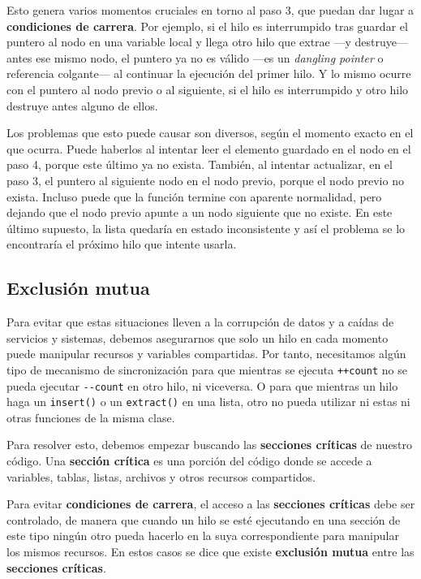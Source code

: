 Esto genera varios momentos cruciales en torno al paso 3, que puedan dar
lugar a \textbf{condiciones de carrera}. Por ejemplo, si el hilo es
interrumpido tras guardar el puntero al nodo en una variable local y
llega otro hilo que extrae ---y destruye--- antes ese mismo nodo, el
puntero ya no es válido ---es un \emph{dangling pointer} o referencia
colgante--- al continuar la ejecución del primer hilo. Y lo mismo ocurre
con el puntero al nodo previo o al siguiente, si el hilo es interrumpido
y otro hilo destruye antes alguno de ellos.

Los problemas que esto puede causar son diversos, según el momento
exacto en el que ocurra. Puede haberlos al intentar leer el elemento
guardado en el nodo en el paso 4, porque este último ya no exista.
También, al intentar actualizar, en el paso 3, el puntero al siguiente
nodo en el nodo previo, porque el nodo previo no exista. Incluso puede
que la función termine con aparente normalidad, pero dejando que el nodo
previo apunte a un nodo siguiente que no existe. En este último
supuesto, la lista quedaría en estado inconsistente y así el problema se
lo encontraría el próximo hilo que intente usarla.

\subsection{Exclusión mutua}\label{_exclusiuxf3n_mutua}

Para evitar que estas situaciones lleven a la corrupción de datos y a
caídas de servicios y sistemas, debemos asegurarnos que solo un hilo en
cada momento puede manipular recursos y variables compartidas. Por
tanto, necesitamos algún tipo de mecanismo de sincronización para que
mientras se ejecuta \texttt{++count} no se pueda ejecutar
\texttt{-\/-count} en otro hilo, ni viceversa. O para que mientras un
hilo haga un \texttt{insert()} o un \texttt{extract()} en una lista,
otro no pueda utilizar ni estas ni otras funciones de la misma clase.

Para resolver esto, debemos empezar buscando las \textbf{secciones
críticas} de nuestro código. Una \textbf{sección crítica} es una porción
del código donde se accede a variables, tablas, listas, archivos y otros
recursos compartidos.

Para evitar \textbf{condiciones de carrera}, el acceso a las
\textbf{secciones críticas} debe ser controlado, de manera que cuando un
hilo se esté ejecutando en una sección de este tipo ningún otro pueda
hacerlo en la suya correspondiente para manipular los mismos recursos.
En estos casos se dice que existe \textbf{{}exclusión mutua} entre las
\textbf{secciones críticas}.

